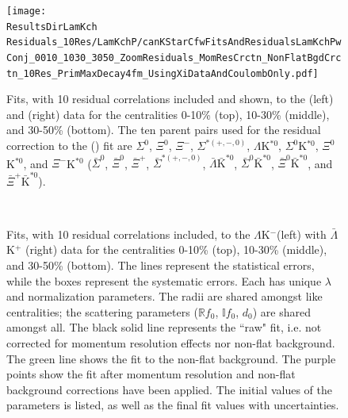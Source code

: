 \documentclass[../AnalysisNoteJBuxton.tex]{subfiles}
\begin{document}
\begin{figure}[h]
  \centering
  \texttt{[image: \\ResultsDirLamKch Residuals\_10Res/LamKchP/canKStarCfwFitsAndResidualsLamKchPwConj\_0010\_1030\_3050\_ZoomResiduals\_MomResCrctn\_NonFlatBgdCrctn\_10Res\_PrimMaxDecay4fm\_UsingXiDataAndCoulombOnly.pdf]}
  \caption[\LamKchPALamKchM Fits showing 10 Residuals]{Fits, with 10 residual correlations included and shown, to the \LamKchP (left) and \ALamKchM (right) data for the centralities 0-10\% (top), 10-30\% (middle), and 30-50\% (bottom).  The ten parent pairs used for the residual correction to the \LamKchP (\ALamKchM) fit are $\Sigma^{0}$\KchP, $\Xi^{0}$\KchP, $\Xi^{-}$\KchP, $\Sigma^{*(+,-,0)}$\KchP, $\Lambda$K$^{*0}$, $\Sigma^{0}$K$^{*0}$, $\Xi^{0}$K$^{*0}$, and $\Xi^{-}$K$^{*0}$ ($\bar{\Sigma}^{0}$\KchM, $\bar{\Xi}^{0}$\KchM, $\bar{\Xi}^{+}$\KchM, $\bar{\Sigma}^{*(+,-,0)}$\KchM, $\bar{\Lambda}\bar{\mathrm{K}}^{*0}$, $\bar{\Sigma}^{0}\bar{\mathrm{K}}^{*0}$, $\bar{\Xi}^{0}\bar{\mathrm{K}}^{*0}$, and $\bar{\Xi}^{+}\bar{\mathrm{K}}^{*0}$).}
  \label{fig:LamKchPwConjFitsAndResiduals_10Res}
\end{figure}






\begin{figure}[h!]
  \centering
  \\  
  \caption[$\Lambda$K$^{-}$($\bar{\Lambda}$K$^{+}$) Fits with 10 Residuals]{Fits, with 10 residual correlations included, to the $\Lambda$K$^{-}$(left) with $\bar{\Lambda}$K$^{+}$ (right) data for the centralities 0-10\% (top), 10-30\% (middle), and 30-50\% (bottom).
The lines represent the statistical errors, while the boxes represent the systematic errors.  
Each has unique $\lambda$ and normalization parameters.
The radii are shared amongst like centralities; the scattering parameters ($\mathbb{R}f_{0}$, $\mathbb{I}f_{0}$, $d_{0}$) are shared amongst all.
The black solid line represents the ``raw" fit, i.e. not corrected for momentum resolution effects nor non-flat background.  
The green line shows the fit to the non-flat background.
The purple points show the fit after momentum resolution and non-flat background corrections have been applied.
The initial values of the parameters is listed, as well as the final fit values with uncertainties.}
  \label{fig:LamKchMwConjFits_10Res}
\end{figure}
\end{document}

